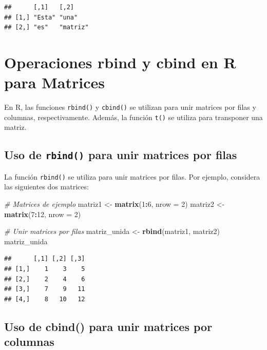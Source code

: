 \documentclass[
]{book}
\newenvironment{Shaded}{\begin{snugshade}}{\end{snugshade}}
\newcommand{\AttributeTok}[1]{\textcolor[rgb]{0.13,0.29,0.53}{#1}}
\newcommand{\CommentTok}[1]{\textcolor[rgb]{0.56,0.35,0.01}{\textit{#1}}}
\newcommand{\DecValTok}[1]{\textcolor[rgb]{0.00,0.00,0.81}{#1}}
\newcommand{\FunctionTok}[1]{\textcolor[rgb]{0.13,0.29,0.53}{\textbf{#1}}}
\newcommand{\NormalTok}[1]{#1}
\newcommand{\OtherTok}[1]{\textcolor[rgb]{0.56,0.35,0.01}{#1}}
\newcommand{\SpecialCharTok}[1]{\textcolor[rgb]{0.81,0.36,0.00}{\textbf{#1}}}
\begin{document}
\begin{verbatim}
##      [,1]   [,2]    
## [1,] "Esta" "una"   
## [2,] "es"   "matriz"
\end{verbatim}

\hypertarget{operaciones-rbind-y-cbind-en-r-para-matrices}{%
\chapter{Operaciones rbind y cbind en R para Matrices}\label{operaciones-rbind-y-cbind-en-r-para-matrices}}

En R, las funciones \texttt{rbind()} y \texttt{cbind()} se utilizan para unir matrices por filas y columnas, respectivamente. Además, la función \texttt{t()} se utiliza para transponer una matriz.

\hypertarget{uso-de-rbind-para-unir-matrices-por-filas}{%
\section{\texorpdfstring{Uso de \texttt{rbind()} para unir matrices por filas}{Uso de rbind() para unir matrices por filas}}\label{uso-de-rbind-para-unir-matrices-por-filas}}

La función \texttt{rbind()} se utiliza para unir matrices por filas. Por ejemplo, considera las siguientes dos matrices:

\begin{Shaded}
\begin{Highlighting}[]
\CommentTok{\# Matrices de ejemplo}
\NormalTok{matriz1 }\OtherTok{\textless{}{-}} \FunctionTok{matrix}\NormalTok{(}\DecValTok{1}\SpecialCharTok{:}\DecValTok{6}\NormalTok{, }\AttributeTok{nrow =} \DecValTok{2}\NormalTok{)}
\NormalTok{matriz2 }\OtherTok{\textless{}{-}} \FunctionTok{matrix}\NormalTok{(}\DecValTok{7}\SpecialCharTok{:}\DecValTok{12}\NormalTok{, }\AttributeTok{nrow =} \DecValTok{2}\NormalTok{)}

\CommentTok{\# Unir matrices por filas}
\NormalTok{matriz\_unida }\OtherTok{\textless{}{-}} \FunctionTok{rbind}\NormalTok{(matriz1, matriz2)}
\NormalTok{matriz\_unida}
\end{Highlighting}
\end{Shaded}

\begin{verbatim}
##      [,1] [,2] [,3]
## [1,]    1    3    5
## [2,]    2    4    6
## [3,]    7    9   11
## [4,]    8   10   12
\end{verbatim}

\hypertarget{uso-de-cbind-para-unir-matrices-por-columnas}{%
\section{Uso de cbind() para unir matrices por columnas}\label{uso-de-cbind-para-unir-matrices-por-columnas}}
\end{document}
